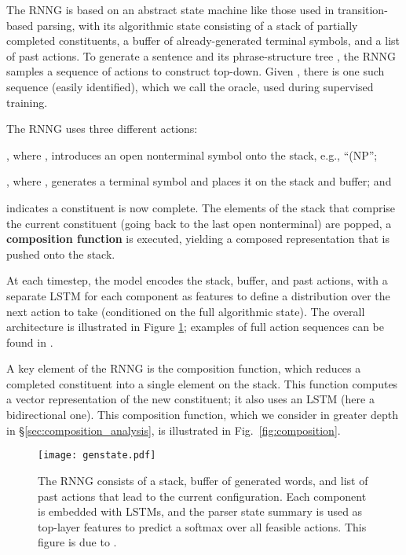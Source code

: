 \documentclass[11pt]{article}
\newenvironment{itemizesquish}{\begin{list}{\setcounter{enumi}{0}\labelitemi}{\setlength{\itemsep}{-0.25em}\setlength{\labelwidth}{0.5em}\setlength{\leftmargin}{\labelwidth}\addtolength{\leftmargin}{\labelsep}}}{\end{list}}
\begin{document}
The RNNG is based on an abstract state machine like those used in transition-based parsing, with its algorithmic state consisting of a stack of partially completed constituents, a buffer of already-generated terminal symbols, and a list of past actions. To generate a sentence  and its phrase-structure tree , the RNNG samples a sequence of actions to construct  top-down. Given , there is one such sequence (easily identified), which we call the oracle,  used during supervised training.

The RNNG uses three different actions:
\begin{itemizesquish}
\item , where , introduces an open nonterminal symbol onto the stack, e.g., ``(NP'';
\item , where , generates a terminal symbol and places it on the stack and buffer; and
\item  indicates a constituent is now complete.  The elements of the stack that comprise the current constituent (going back to the last open nonterminal) are popped, a \textbf{composition function} is executed, yielding a composed representation that is pushed onto the stack.
\end{itemizesquish}

At each timestep, the model encodes the stack, buffer, and past actions, with a separate LSTM \cite{hochreiter_97} for each component as features to define a distribution over the next action to take (conditioned on the full algorithmic state).  
The overall architecture is illustrated in Figure \ref{fig:genstate}; examples of full action sequences can be found in .

A key element of the RNNG is the composition function, which reduces a completed constituent into a single element on the stack.  This function computes a vector representation of the new constituent; it also uses an LSTM (here a bidirectional one).  This composition function, which we consider in greater depth in \S\ref{sec:composition_analysis}, is illustrated in Fig.~\ref{fig:composition}.


\begin{figure}
\centering
\vspace{-.2cm}\texttt{[image: genstate.pdf]}
\vspace{-.7cm}\caption{The RNNG consists of a stack, buffer of generated words, and list of past actions that lead to the current configuration. Each component is embedded with LSTMs, and the parser state summary  is used as top-layer features to predict a softmax over all feasible actions. This figure is due to .
\label{fig:genstate}}
\end{figure}
\end{document}
